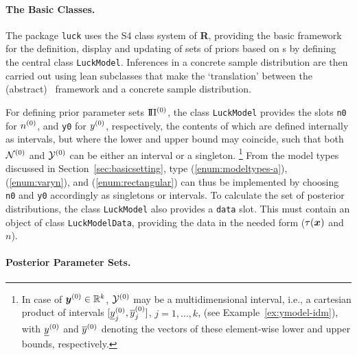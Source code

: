 \paragraph{The Basic Classes.} %

The package \texttt{luck} uses the S4 class system of
\textbf{R}, providing the basic framework for the definition, display and updating of
sets of priors based on \model s by defining the central class \texttt{LuckModel}.
Inferences in a concrete sample distribution are then carried out
using lean subclasses that make the `translation'
between the (abstract) \model\ framework and a concrete sample distribution.

For defining prior parameter sets $\text{I}\!\Pi^{(0)}$,
the class \texttt{LuckModel} provides the slots \texttt{n0} for $n^{(0)}$, and \texttt{y0} for $y^{(0)}$, respectively,
the contents of which are defined internally as intervals,
but where the lower and upper bound may coincide,
such that both $\mathcal{N}^{(0)}$ and $\mathcal{Y}^{(0)}$ can be either an interval or a singleton.%
\footnote{In case of ${\bm y}^{(0)} \in \mathbb{R}^k$, $\mathcal{Y}^{(0)}$ may be a multidimensional interval,
i.e., a cartesian product of intervals $[\underline{y}^{(0)}_j,\overline{y}^{(0)}_j]$, $j=1,\ldots,k$,
(see Example~\ref{ex:ymodel-idm}),
with $\underline{y}^{(0)}$ and $\overline{y}^{(0)}$ denoting the vectors of these element-wise lower and upper bounds, respectively.} 
From the model types discussed in Section~\ref{sec:basicsetting}, type
(\ref{enum:modeltypes-a}), (\ref{enum:varyn}), and (\ref{enum:rectangular})
can thus be implemented by choosing \texttt{n0} and \texttt{y0} accordingly
as singletons or intervals.
%
To calculate the set of posterior distributions,
the class \texttt{LuckModel} also provides a \texttt{data} slot.
This must contain an object of class \texttt{LuckModelData},
providing the data in the needed form ($\tau({\bm x})$ and $n$).

\paragraph{Posterior Parameter Sets.}

